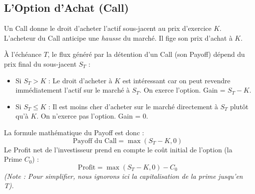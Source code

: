 \subsection{L'Option d'Achat (Call)}

\begin{definitionbox}[Le Call]
Un Call donne le droit d'acheter l'actif sous-jacent au prix d'exercice $K$.
L'acheteur du Call anticipe une \textit{hausse} du marché. Il fige son prix d'achat à $K$.
\end{definitionbox}

À l'échéance $T$, le flux généré par la détention d'un Call (son Payoff) dépend du prix final du sous-jacent $S_T$ :
\begin{itemize}[label=$\rightarrow$]
    \item Si $S_T > K$ : Le droit d'acheter à $K$ est intéressant car on peut revendre immédiatement l'actif sur le marché à $S_T$. On exerce l'option. Gain = $S_T - K$.
    \item Si $S_T \leq K$ : Il est moins cher d'acheter sur le marché directement à $S_T$ plutôt qu'à $K$. On n'exerce pas l'option. Gain = $0$.
\end{itemize}
La formule mathématique du Payoff est donc :
\begin{equation}
    \label{eq:fsec1-payoff_call}
    \text{Payoff du Call} = \max(S_T - K, 0)
\end{equation}
Le Profit net de l'investisseur prend en compte le coût initial de l'option (la Prime $C_0$) :
\begin{equation}
    \label{eq:fsec1-profit_call}
    \text{Profit} = \max(S_T - K, 0) - C_0
\end{equation}
\textit{(Note : Pour simplifier, nous ignorons ici la capitalisation de la prime jusqu'en T).}

\vspace{0.5cm}
\begin{center}
\end{center}
\vspace{0.5cm}


